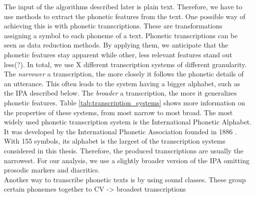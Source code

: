 






The input of the algorithms described later is plain text.
Therefore, we have to use methods to extract the phonetic features from the text.
One possible way of achieving this is with phonetic transcriptions.
These are transformations assigning a symbol to each phoneme of a text.
Phonetic transcriptions can be seen as data reduction methods.
By applying them, we anticipate that the phonetic features stay apparent while other, less relevant features stand out less(?).
In total, we use X different transcription systems of different granularity.
The \textit{narrower} a transcription, the more closely it follows the phonetic details of an utterance.
This often leads to the system having a bigger alphabet, such as the IPA described below.
The \textit{broader} a transcription, the more it generalizes phonetic features.
Table \ref{tab:transcription_systems} shows more information on the properties of these systems, from most narrow to most broad.
The most widely used phonetic transcription system is the International Phonetic Alphabet. %
It was developed by the International Phonetic Association founded in 1886 \cite{ipa1999ipaHandbook}.
With 155 symbols, its alphabet is the largest of the transcription systems considered in this thesis.
Therefore, the produced transcriptions are usually the narrowest.
For our analysis, we use a slightly broader version of the IPA omitting prosodic markers and diacritics.\\ %

Another way to transcribe phonetic texts is by using sound classes.
These group certain phonemes together to
CV -> broadest transcriptions




